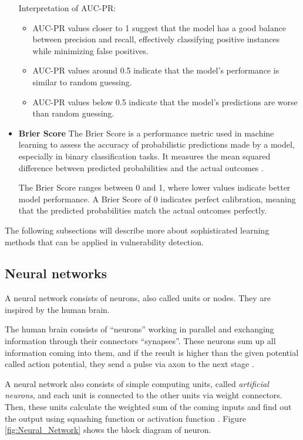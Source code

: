 \begin{itemize}
Interpretation of AUC-PR:

\begin{itemize}
\item AUC-PR values closer to 1 suggest that the model has a good balance between precision and recall, effectively classifying positive instances while minimizing false positives.
\item AUC-PR values around 0.5 indicate that the model's performance is similar to random guessing.
\item AUC-PR values below 0.5 indicate that the model's predictions are worse than random guessing.
\end{itemize}

\item \textbf{Brier Score}
The Brier Score is a performance metric used in machine learning to assess the accuracy of probabilistic predictions made by a model, especially in binary classification tasks. It measures the mean squared difference between predicted probabilities and the actual outcomes \cite{Somogyi2021}.

The Brier Score ranges between 0 and 1, where lower values indicate better model performance. A Brier Score of 0 indicates perfect calibration, meaning that the predicted probabilities match the actual outcomes perfectly.

\end{itemize}

The following subsections will describe more about sophisticated learning methods that can be applied in vulnerability detection.



\subsection{Neural networks} %
\label{sub: Neural_networks}

A neural network consists of neurons, also called units or nodes.  They are inspired by the human brain.

The human brain consists of  “neurons” working in parallel and exchanging information through their connectors “synapses”.  These neurons sum up all information coming into them, and if the result is higher than the given potential called action potential, they send a pulse via axon to the next stage \cite{dspguide}.

A neural network also consists of simple computing units, called \textit{artificial neurons}, and each unit is connected to the other units via weight connectors. Then, these units calculate the weighted sum of the coming inputs and find out the output using squashing function or activation function \cite{inbook}. Figure \ref{fig:Neural_Network} shows the block diagram of neuron.

